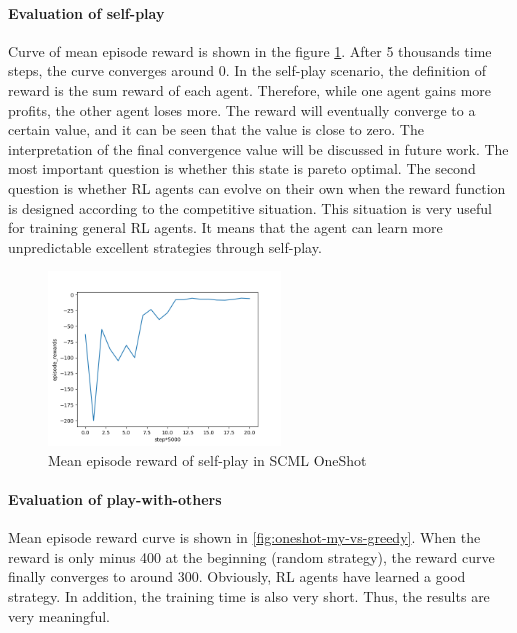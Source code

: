 \paragraph{Evaluation of self-play} 
Curve of mean episode reward is shown in the figure \ref{fig:oneshot-self-play}. After 5 thousands time steps, the curve converges around 0. In the self-play scenario, the definition of reward is the sum reward of each agent. Therefore, while one agent gains more profits, the other agent loses more. The reward will eventually converge to a certain value, and it can be seen that the value is close to zero. The interpretation of the final convergence value will be discussed in future work. The most important question is whether this state is pareto optimal. The second question is whether RL agents can evolve on their own when the reward function is designed according to the competitive situation. This situation is very useful for training general RL agents. It means that the agent can learn more unpredictable excellent strategies through self-play.

\begin{figure}[htbp]
\centering
\includegraphics[width=0.55\textwidth]{./images/oneshot_self_play.png}
\caption{Mean episode reward of self-play in SCML OneShot}
\label{fig:oneshot-self-play}
\end{figure}

\paragraph{Evaluation of play-with-others}

Mean episode reward curve is shown in \ref{fig:oneshot-my-vs-greedy}. When the reward is only minus 400 at the beginning (random strategy), the reward curve finally converges to around 300. Obviously, RL agents have learned a good strategy. In addition, the training time is also very short. Thus, the results are very meaningful.

